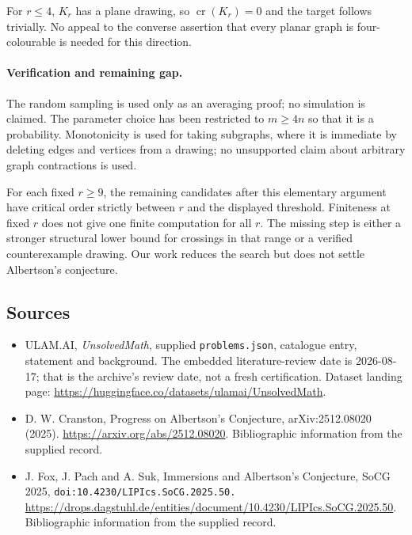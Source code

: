 \documentclass[11pt,a4paper]{article}
\begin{document}
For $r\le4$, $K_r$ has a plane drawing, so $\operatorname{cr}(K_r)=0$ and the target follows trivially. No appeal to the converse assertion that every planar graph is four-colourable is needed for this direction.

\paragraph{Verification and remaining gap.}
The random sampling is used only as an averaging proof; no simulation is claimed. The parameter choice has been restricted to $m\ge4n$ so that it is a probability. Monotonicity is used for taking subgraphs, where it is immediate by deleting edges and vertices from a drawing; no unsupported claim about arbitrary graph contractions is used.

For each fixed $r\ge9$, the remaining candidates after this elementary argument have critical order strictly between $r$ and the displayed threshold. Finiteness at fixed $r$ does not give one finite computation for all $r$. The missing step is either a stronger structural lower bound for crossings in that range or a verified counterexample drawing. Our work reduces the search but does not settle Albertson's conjecture.

\subsection{Sources}

{\small

\begin{itemize}

\item[\hypertarget{source:statement:1}{S1}] ULAM.AI, \emph{UnsolvedMath}, supplied \texttt{problems.json}, catalogue entry, statement and background. The embedded literature-review date is 2026-08-17; that is the archive’s review date, not a fresh certification. Dataset landing page: \url{https://huggingface.co/datasets/ulamai/UnsolvedMath}.

\item[\hypertarget{source:statement:2}{S2}] D. W. Cranston, Progress on Albertson's Conjecture, arXiv:2512.08020 (2025). \url{https://arxiv.org/abs/2512.08020}. Bibliographic information from the supplied record.

\item[\hypertarget{source:statement:3}{S3}] J. Fox, J. Pach and A. Suk, Immersions and Albertson's Conjecture, SoCG 2025, \nolinkurl{doi:10.4230/LIPIcs.SoCG.2025.50.} \url{https://drops.dagstuhl.de/entities/document/10.4230/LIPIcs.SoCG.2025.50}. Bibliographic information from the supplied record.

\end{itemize}

}

\label{end:statement}
\end{document}
